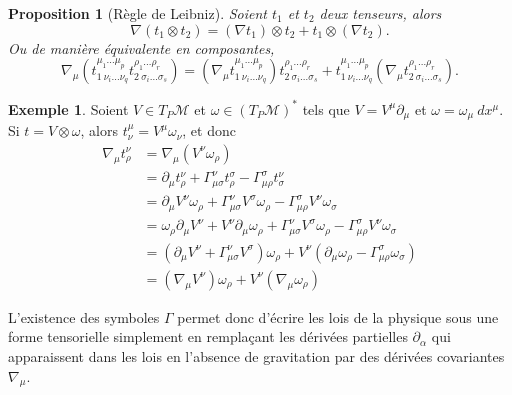 \documentclass[a4paper,11pt]{report}
\theoremstyle{definition}
\theoremstyle{plain}
\newtheorem{prop}[thm]{Proposition}
\theoremstyle{definition}
\newtheorem{exmp}{Exemple}[chapter]
\theoremstyle{remark}
\newcommand{\M}{\mathscr{M}}
\newcommand{\p}{\partial}
\begin{document}
                \begin{prop}[Règle de Leibniz]
                    Soient $t_1$ et $t_2$ deux tenseurs, alors
                    \begin{equation}
                        \nabla(t_1\otimes t_2) = (\nabla t_1)\otimes t_2 + t_1\otimes(\nabla t_2).
                    \end{equation}
                    Ou de manière équivalente en composantes,
                    \begin{equation}
                         \nabla_\mu (t^{\mu_1\dots\mu_p}_{1~\nu_i\dots\nu_q}t^{\rho_1\dots\rho_r}_{2~\sigma_i\dots\sigma_s}) = (\nabla_\mu t^{\mu_1\dots\mu_p}_{1~\nu_i\dots\nu_q})t^{\rho_1\dots\rho_r}_{2~\sigma_i\dots\sigma_s} + t^{\mu_1\dots\mu_p}_{1~\nu_i\dots\nu_q} (\nabla_\mu t^{\rho_1\dots\rho_r}_{2~\sigma_i\dots\sigma_s}).
                    \end{equation}
                \end{prop}
                
                \begin{exmp}
                    Soient $V\in T_P\M$ et $\omega\in (T_P\M)^*$ tels que $V = V^\mu\p_\mu$ et $\omega = \omega_\mu~dx^\mu$. Si $t = V\otimes\omega$, alors $t^\mu_\nu = V^\mu\omega_\nu$, et donc
                    \begin{align}
                        \nabla_\mu t^\nu_\rho &= \nabla_\mu(V^\nu\omega_\rho)\\
                        &= \p_\mu t^\nu_\rho + \Gamma^\nu_{\mu\sigma}t^\sigma_\rho - \Gamma^\sigma_{\mu\rho} t^\nu_{\sigma}\\
                        &= \p_\mu V^\nu\omega_\rho + \Gamma^\nu_{\mu\sigma}V^\sigma\omega_\rho - \Gamma^\sigma_{\mu\rho} V^\nu\omega_\sigma\\
                        &= \omega_\rho\p_\mu V^\nu + V^\nu\p_\mu \omega_\rho + \Gamma^\nu_{\mu\sigma}V^\sigma\omega_\rho - \Gamma^\sigma_{\mu\rho} V^\nu\omega_\sigma\\
                        &= \left( \p_\mu V^\nu + \Gamma^\nu_{\mu\sigma}V^\sigma \right)\omega_\rho + V^\nu\left( \p_\mu \omega_\rho - \Gamma^\sigma_{\mu\rho}\omega_\sigma \right)\\
                        &= (\nabla_\mu V^\nu)\omega_\rho + V^\nu(\nabla_\mu\omega_\rho)
                    \end{align}
                \end{exmp}
                
                \begin{leftbar}
                    L'existence des symboles $\Gamma$ permet donc d'écrire les lois de la physique sous une forme tensorielle simplement en remplaçant les dérivées partielles $\p_\alpha$ qui apparaissent dans les lois en l'absence de gravitation par des dérivées covariantes $\nabla_\mu$.
                \end{leftbar}
                
\end{document}
